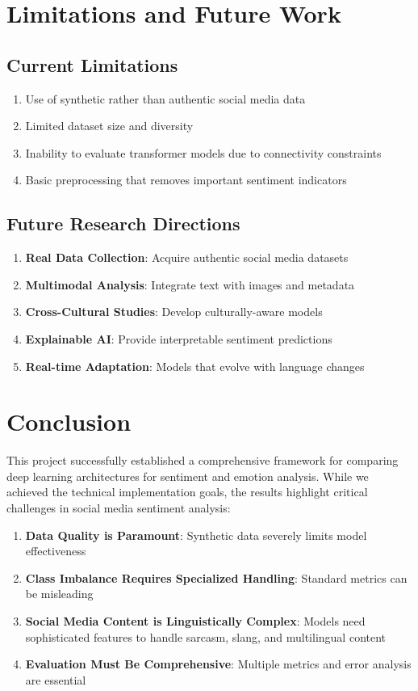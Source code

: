 \documentclass[11pt,a4paper]{article}
\begin{document}
\section{Limitations and Future Work}

\subsection{Current Limitations}

\begin{enumerate}
    \item Use of synthetic rather than authentic social media data
    \item Limited dataset size and diversity
    \item Inability to evaluate transformer models due to connectivity constraints
    \item Basic preprocessing that removes important sentiment indicators
\end{enumerate}

\subsection{Future Research Directions}

\begin{enumerate}
    \item \textbf{Real Data Collection}: Acquire authentic social media datasets
    \item \textbf{Multimodal Analysis}: Integrate text with images and metadata
    \item \textbf{Cross-Cultural Studies}: Develop culturally-aware models
    \item \textbf{Explainable AI}: Provide interpretable sentiment predictions
    \item \textbf{Real-time Adaptation}: Models that evolve with language changes
\end{enumerate}

\section{Conclusion}

This project successfully established a comprehensive framework for comparing deep learning architectures for sentiment and emotion analysis. While we achieved the technical implementation goals, the results highlight critical challenges in social media sentiment analysis:

\begin{enumerate}
    \item \textbf{Data Quality is Paramount}: Synthetic data severely limits model effectiveness
    \item \textbf{Class Imbalance Requires Specialized Handling}: Standard metrics can be misleading
    \item \textbf{Social Media Content is Linguistically Complex}: Models need sophisticated features to handle sarcasm, slang, and multilingual content
    \item \textbf{Evaluation Must Be Comprehensive}: Multiple metrics and error analysis are essential
\end{enumerate}
\end{document}
